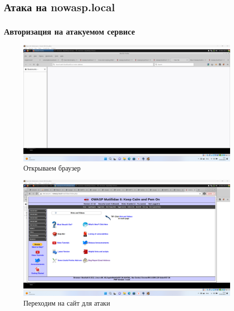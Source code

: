 \documentclass[a4paper]{article}
\begin{document}
  \subsection{Атака на nowasp.local}

  \subsubsection{Авторизация на атакуемом сервисе}

  \begin{figure}[H]
    \centering
    \includegraphics[width=\textwidth]{Screenshot_11}
    \caption{Открываем браузер}
  \end{figure}

  \begin{figure}[H]
    \centering
    \includegraphics[width=\textwidth]{Screenshot_15}
    \caption{Переходим на сайт для атаки}
  \end{figure}
\end{document}
